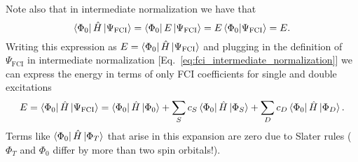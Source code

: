 \documentclass[../Main/chem532-notes.tex]{subfiles}
\begin{document}
Note also that in intermediate normalization we have that
\begin{equation}
\bra{\Phi_0}\hat{H}\ket{\Psi_\mathrm{FCI}}
= \bra{\Phi_0}E\ket{\Psi_\mathrm{FCI}}
= E \braket{\Phi_0 | \Psi_\mathrm{FCI}} = E.
\end{equation}
Writing this expression as $E = \bra{\Phi_0}\hat{H}\ket{\Psi_\mathrm{FCI}}$ and plugging in the definition of $\Psi_\mathrm{FCI}$ in intermediate normalization [Eq.~\eqref{eq:fci_intermediate_normalization}] we can express the energy in terms of only FCI coefficients for single and double excitations
\begin{equation}
E = \bra{\Phi_0}\hat{H}\ket{\Psi_\mathrm{FCI}}=
\bra{\Phi_0}\hat{H}\ket{\Phi_0} + \sum_S c_S \bra{\Phi_0}\hat{H}\ket{\Phi_S} + \sum_D c_D \bra{\Phi_0}\hat{H}\ket{\Phi_D}.
\end{equation}
Terms like $\bra{\Phi_0}\hat{H}\ket{\Phi_T}$ that arise in this expansion are zero due to Slater rules ($\Phi_T$ and $\Phi_0$ differ by more than two spin orbitals!).
\end{document}
